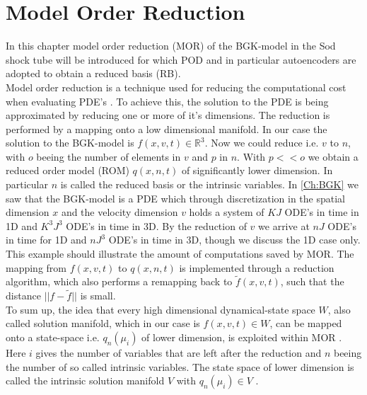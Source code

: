 
\chapter{Model Order Reduction}
\label{Ch:ROM}


In this chapter model order reduction (MOR) of the BGK-model in the Sod shock tube will be introduced for which POD and in particular autoencoders are adopted to obtain a reduced basis (RB).\\
Model order reduction is a technique used for reducing the computational cost when evaluating PDE's \cite{Bernard}\cite{Carlberg}\cite{ohlberger2015reduced}. To achieve this, the solution to the PDE is being approximated by reducing one or more of it's dimensions. The reduction is performed by a mapping onto a low dimensional manifold. In our case the solution to the BGK-model is \(f(x,v,t) \in \mathbb{R}^3\). Now we could reduce i.e. \(v\) to \(n\), with \(o\) beeing the number of elements in \(v\) and \(p\) in \(n\). With \(p << o\) we obtain a reduced order model (ROM) \(q(x,n,t)\) of significantly lower dimension. In particular \(n\) is called the reduced basis or the intrinsic variables. In \cref{Ch:BGK} we saw that the BGK-model is a PDE which through discretization in the spatial dimension \(x\) and the velocity dimension \(v\) holds a system of \(KJ\) ODE's in time in 1D and \(K^3J^3\) ODE's in time in 3D.  By the reduction of \(v\) we arrive at \(nJ\) ODE's in time for 1D and \(nJ^3\) ODE's in time in 3D, though we discuss the 1D case only. This example should illustrate the amount of computations saved by MOR. The mapping from \(f(x,v,t)\) to \(q(x,n,t)\) is implemented through a reduction algorithm, which also performs a remapping back to \(\tilde{f}(x,v,t)\), such that the distance \(||f - \tilde{f}||\) is small.\\
To sum up, the idea that every high dimensional dynamical-state space \(W\), also called solution manifold, which in our case is \(f(x,v,t) \in W\), can be mapped onto a state-space i.e. \(q_n(\mu_i)\)  of lower dimension, is exploited within MOR \cite{ohlberger2015reduced}. Here \(i\) gives the number of variables that are left after the reduction and \(n\) beeing the number of so called intrinsic variables. The state space of lower dimension is called the intrinsic solution manifold \(V\) with \(q_n(\mu_i) \in V\) \cite{Carlberg}.\\
